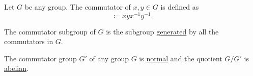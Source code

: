 \begin{definition}\label{def:group_commutator}
  Let \( G \) be any group. The commutator of \( x, y \in G \) is defined as
  \begin{equation*}
    [x, y] \coloneqq xyx^{-1}y^{-1}.
  \end{equation*}

  The commutator subgroup of \( G \) is the subgroup \hyperref[def:group_presentation]{generated} by all the commutators in \( G \).
\end{definition}

\begin{proposition}\label{thm:quotient_by_commutator_subgroup}
  The commutator group \( G' \) of any group \( G \) is \hyperref[def:normal_subgroup]{normal} and the quotient \( G / G' \) is \hyperref[def:abelian_group]{abelian}.
\end{proposition}
